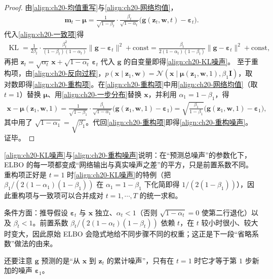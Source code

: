 \documentclass[../../main.tex]{subfiles}
\begin{document}
\begin{proof}
由\eqref{align:ch20-均值重写}与\eqref{align:ch20-网络均值}，
\begin{align*}
\bm{m}_t-\bm{\mu}=\frac{1}{\sqrt{1-\beta_t}}\cdot\frac{\beta_t}{\sqrt{1-\alpha_t}}\big(\bm{g}(\bm{z}_t,\bm{w},t)-\bm{\varepsilon}_t\big).
\end{align*}
代入\eqref{align:ch20-一致项}得
\begin{align*}
\operatorname{KL}=\frac{1}{2\beta_t}\cdot\frac{\beta_t^2}{(1-\beta_t)(1-\alpha_t)}\|\bm{g}-\bm{\varepsilon}_t\|^2+\mathrm{const}=\frac{\beta_t}{2(1-\alpha_t)(1-\beta_t)}\|\bm{g}-\bm{\varepsilon}_t\|^2+\mathrm{const},
\end{align*}
再把 $\bm{z}_t=\sqrt{\alpha_t}\,\bm{x}+\sqrt{1-\alpha_t}\,\bm{\varepsilon}_t$ 代入 $\bm{g}$ 的自变量即得\eqref{align:ch20-KL噪声}。
至于重构项，由\eqref{align:ch20-反向过程}，$p(\bm{x}\mid\bm{z}_1,\bm{w})=\mathcal{N}(\bm{x}\mid\bm{\mu}(\bm{z}_1,\bm{w},1),\beta_1\bm{I})$，取对数即得\eqref{align:ch20-重构项}。在\eqref{align:ch20-重构项}中用\eqref{align:ch20-网络均值}（取 $t=1$）替换 $\bm{\mu}$、用\eqref{align:ch20-一步分布}替换 $\bm{x}$，并利用 $\alpha_1=1-\beta_1$，得
\begin{align*}
\bm{x}-\bm{\mu}(\bm{z}_1,\bm{w},1)=\frac{1}{\sqrt{1-\beta_1}}\cdot\frac{\beta_1}{\sqrt{1-\alpha_1}}\big(\bm{g}(\bm{z}_1,\bm{w},1)-\bm{\varepsilon}_1\big)=\sqrt{\frac{\beta_1}{1-\beta_1}}\big(\bm{g}(\bm{z}_1,\bm{w},1)-\bm{\varepsilon}_1\big),
\end{align*}
其中用了 $\sqrt{1-\alpha_1}=\sqrt{\beta_1}$。代回\eqref{align:ch20-重构项}即得\eqref{align:ch20-重构噪声}。证毕。
\end{proof}

\begin{remark}
\eqref{align:ch20-KL噪声}与\eqref{align:ch20-重构噪声}说明：在“预测总噪声”的参数化下，ELBO 的每一项都变成“网络输出与真实噪声之差”的平方，只是前置系数不同。重构项正好是 $t=1$ 时\eqref{align:ch20-KL噪声}的特例（把 $\beta_1/(2(1-\alpha_1)(1-\beta_1))$ 在 $\alpha_1=1-\beta_1$ 下化简即得 $1/(2(1-\beta_1))$），因此重构项与一致项可以合并成对 $t=1,\cdots,T$ 的统一求和。\par
条件方面：推导假设 $\bm{\varepsilon}_t$ 与 $\bm{x}$ 独立、$\alpha_t<1$（否则 $\sqrt{1-\alpha_t}=0$ 使第二行退化）以及 $\beta_t<1$。前置系数 $\beta_t/(2(1-\alpha_t)(1-\beta_t))$ 依赖 $t$，在 $t$ 较小时很小、较大时变大，因此原始 ELBO 会隐式地给不同步骤不同的权重；这正是下一段“省略系数”做法的由来。\par
还要注意 $\bm{g}$ 预测的是“从 $\bm{x}$ 到 $\bm{z}_t$ 的累计噪声”，只有在 $t=1$ 时它才等于第 $1$ 步新加的噪声 $\bm{\varepsilon}_1$。
\end{remark}
\end{document}
